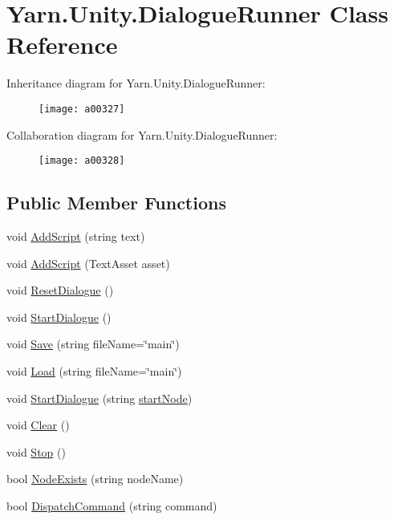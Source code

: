 \hypertarget{a00037}{\section{Yarn.\-Unity.\-Dialogue\-Runner Class Reference}
\label{a00037}
}


Inheritance diagram for Yarn.\-Unity.\-Dialogue\-Runner\-:
\nopagebreak
\begin{figure}[H]
\begin{center}
\leavevmode
\texttt{[image: a00327]}
\end{center}
\end{figure}


Collaboration diagram for Yarn.\-Unity.\-Dialogue\-Runner\-:
\nopagebreak
\begin{figure}[H]
\begin{center}
\leavevmode
\texttt{[image: a00328]}
\end{center}
\end{figure}
\subsection*{Public Member Functions}
\begin{DoxyCompactItemize}
\item 
void \hyperlink{a00037_a88d161b1be7c99b1e202e6ae9e0d1e73}{Add\-Script} (string text)
\item 
void \hyperlink{a00037_a2fd7f165afff0b8bc2004f10ce4537dd}{Add\-Script} (Text\-Asset asset)
\item 
void \hyperlink{a00037_ac08900ac15b3ca90446b9454c7fd117e}{Reset\-Dialogue} ()
\item 
void \hyperlink{a00037_ab083d0ac60b41958b591c632e3c3a53e}{Start\-Dialogue} ()
\item 
void \hyperlink{a00037_a7d04224de4b27657edcfb3449dd182c1}{Save} (string file\-Name=\char`\"{}main\char`\"{})
\item 
void \hyperlink{a00037_a3ea5779e3b7b34853f640451616f7308}{Load} (string file\-Name=\char`\"{}main\char`\"{})
\item 
void \hyperlink{a00037_abda765c6804853e264282a0f45920cd3}{Start\-Dialogue} (string \hyperlink{a00037_a61c92b8d2228d01d8ac123b73bbb41a0}{start\-Node})
\item 
void \hyperlink{a00037_a09f5769c0c0921a21e659fed0af09c01}{Clear} ()
\item 
void \hyperlink{a00037_af94e66876098f8b187181014973645e6}{Stop} ()
\item 
bool \hyperlink{a00037_aadf7711b9ba101d6ce8ba491d9c5a4c3}{Node\-Exists} (string node\-Name)
\item 
bool \hyperlink{a00037_a7b200f8ddcf77f50906a6341aadeb671}{Dispatch\-Command} (string command)
\end{DoxyCompactItemize}
